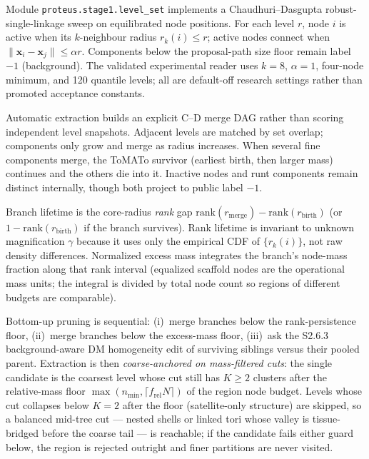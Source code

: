 \documentclass[11pt]{article}
\begin{document}
Module \texttt{proteus.stage1.level\_set} implements a
Chaudhuri--Dasgupta robust-single-linkage sweep on equilibrated node positions.
For each level $r$, node $i$ is active when its $k$-neighbour radius
$r_k(i)\le r$; active nodes connect when
$\lVert\mathbf x_i-\mathbf x_j\rVert\le\alpha r$. Components below the
proposal-path size floor remain label $-1$ (background). The validated
experimental reader uses $k=8$, $\alpha=1$, four-node minimum, and 120
quantile levels; all are default-off research settings rather than promoted
acceptance constants.

Automatic extraction builds an explicit C--D merge DAG rather than scoring
independent level snapshots. Adjacent levels are matched by set overlap;
components only grow and merge as radius increases. When several fine
components merge, the ToMATo survivor (earliest birth, then larger mass)
continues and the others die into it. Inactive nodes and runt components
remain distinct internally, though both project to public label $-1$.

Branch lifetime is the core-radius \emph{rank} gap
$\mathrm{rank}(r_{\mathrm{merge}})-\mathrm{rank}(r_{\mathrm{birth}})$
(or $1-\mathrm{rank}(r_{\mathrm{birth}})$ if the branch survives). Rank
lifetime is invariant to unknown magnification $\gamma$ because it uses
only the empirical CDF of $\{r_k(i)\}$, not raw density differences.
Normalized excess mass integrates the branch's node-mass fraction along
that rank interval (equalized scaffold nodes are the operational mass
units; the integral is divided by total node count so regions of different
budgets are comparable).

Bottom-up pruning is sequential: (i)~merge branches below the rank-persistence
floor, (ii)~merge branches below the excess-mass floor, (iii)~ask the
S2.6.3 background-aware DM homogeneity edit of surviving siblings versus
their pooled parent. Extraction is then \emph{coarse-anchored on
mass-filtered cuts}: the single candidate is the coarsest level whose cut
still has $K\ge 2$ clusters after the relative-mass floor
$\max(n_{\min},\lceil f_{\mathrm{rel}} N\rceil)$ of the region node
budget. Levels whose cut collapses below $K{=}2$ after the floor
(satellite-only structure) are skipped, so a balanced mid-tree cut ---
nested shells or linked tori whose valley is tissue-bridged before the
coarse tail --- is reachable; if the candidate fails either guard below,
the region is rejected outright and finer partitions are never visited.
\end{document}
